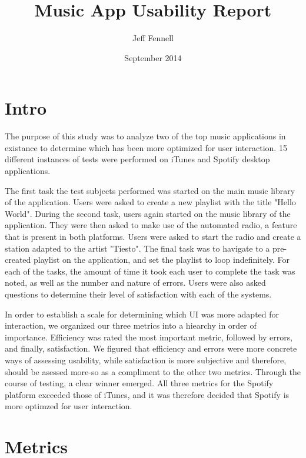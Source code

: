 \documentclass[12pt]{report}
\begin{document}
\title{Music App Usability Report}
\author{Jeff Fennell}
\date{September 2014}
\maketitle

\tableofcontents

\section{Intro}

The purpose of this study was to analyze two of the top music applications in existance to determine which has been more optimized for user interaction. 15 different instances of tests were performed on iTunes and Spotify desktop applications.

The first task the test subjects performed was started on the main music library of the application. Users were asked to create a new playlist with the title "Hello World".  During the second task, users again started on the music library of the application. They were then asked to make use of the automated radio, a feature that is present in both platforms. Users were asked to start the radio and create a station adapted to the artist "Tiesto". The final task was to havigate to a pre-created playlist on the application, and set the playlist to loop indefinitely. For each of the tasks, the amount of time it took each user to complete the task was noted, as well as the number and nature of errors. Users were also asked questions to determine their level of satisfaction with each of the systems.

In order to establish a scale for determining which UI was more adapted for interaction, we organized our three metrics into a hiearchy in order of importance. Efficiency was rated the most important metric, followed by errors, and finally, satisfaction. We figured that efficiency and errors were more concrete ways of assessing usability, while satisfaction is more subjective and therefore, should be asessed more-so as a compliment to the other two metrics. Through the course of testing, a clear winner emerged. All three metrics for the Spotify platform exceeded those of iTunes, and it was therefore decided that Spotify is more optimzed for user interaction.

\section{Metrics}
\end{document}
